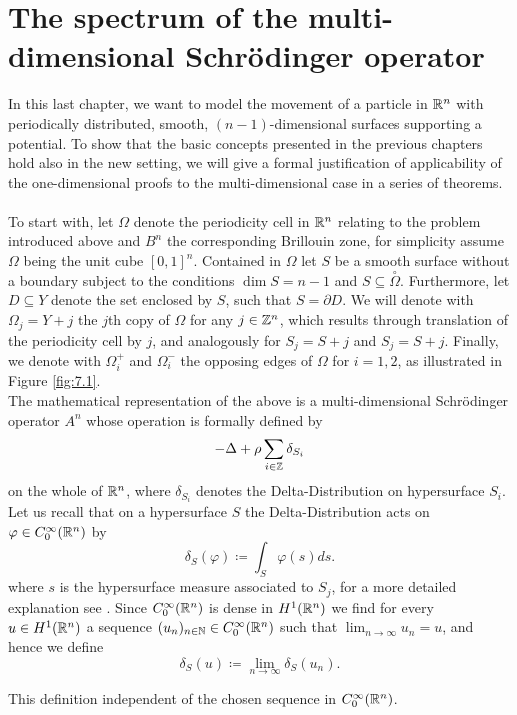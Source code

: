 \chapter{The spectrum of the multi-dimensional Schrödinger operator}  \label{chap:7} 

In this last chapter, we want to model the movement of a particle in $\mathbb{R}^{n}$ with periodically distributed, smooth, $(n-1)$-dimensional surfaces supporting a potential. To show that the basic concepts presented in the previous chapters hold also in the new setting, we will give a formal justification of applicability of the one-dimensional proofs to the multi-dimensional case in a series of theorems.
~\\

To start with, let $\Omega$ denote the periodicity cell in $\mathbb{R}^{n}$ relating to the problem introduced above and $B^{n}$ the corresponding Brillouin zone, for simplicity assume $\Omega$ being the unit cube $[0, 1]^{n}$. Contained in $\Omega$ let $S$ be a smooth surface without a boundary subject to the conditions $\dim S = n - 1$ and $S \subseteq \overset{\circ}{\Omega}$. Furthermore, let $D \subseteq Y$ denote the set enclosed by $S$, such that $S = \partial D$. We will denote with $\Omega_{j} = Y + j$ the $j$th copy of $\Omega$ for any $j \in \mathbb{Z}^{n}$, which results through translation of the periodicity cell by $j$, and analogously for $S_{j} = S + j$ and $S_{j} = S + j$. Finally, we denote with $\Omega_{i}^{+}$ and $\Omega_{i}^{-}$ the opposing edges of $\Omega$ for $i = 1, 2$, as illustrated in Figure \ref{fig:7.1}.
~\\

The mathematical representation of the above is a multi-dimensional Schrödinger operator $A^{n}$ whose operation is formally defined by
\begin{equation}
	- \Delta + \rho \sum_{i \in \mathbb{Z}} \delta_{S_{i}} \label{eq:7.1-md_the_operator_A_formallyy}
\end{equation}
on the whole of $\mathbb{R}^{n}$, where $\delta_{S_{i}}$ denotes the Delta-Distribution on hypersurface $S_{i}$. Let us recall that on a hypersurface $S$ the Delta-Distribution acts on $\varphi \in C_{0}^{\infty}(\mathbb{R}^{n})$ by 
	\[ \delta_{S}\left(\varphi\right) \coloneqq \int_{S} \varphi(s) ds . \]
where $s$ is the hypersurface measure associated to $S_{j}$, for a more detailed explanation see \cite[chapter 14]{forster2012analysis}. Since $C_{0}^{\infty}(\mathbb{R}^{n})$ is dense in $H^{1}(\mathbb{R}^{n})$ we find for every $u \in H^{1}(\mathbb{R}^{n})$ a sequence $(u_{n})_{n \in \mathbb{N}} \in C_{0}^{\infty}(\mathbb{R}^{n})$ such that $\lim_{n \rightarrow \infty} u_{n} = u$, and hence we define
	\[ \delta_{S}\left(u\right) \coloneqq \lim_{n \rightarrow \infty} \delta_{S}\left(u_{n}\right) . \]
\begin{remark}
	This definition independent of the chosen sequence in $C_{0}^{\infty}(\mathbb{R}^{n})$.
\end{remark}

